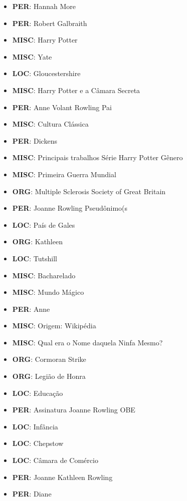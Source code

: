 \documentclass{article}
\begin{document}
\begin{itemize}
\item \textbf{PER}: Hannah More
\item \textbf{PER}: Robert Galbraith
\item \textbf{MISC}: Harry Potter
\item \textbf{MISC}: Yate
\item \textbf{LOC}: Gloucestershire
\item \textbf{MISC}: Harry Potter e a Câmara Secreta
\item \textbf{PER}: Anne Volant Rowling Pai
\item \textbf{MISC}: Cultura Clássica
\item \textbf{PER}: Dickens
\item \textbf{MISC}: Principais trabalhos Série Harry Potter Gênero
\item \textbf{MISC}: Primeira Guerra Mundial
\item \textbf{ORG}: Multiple Sclerosis Society of Great Britain
\item \textbf{PER}: Joanne Rowling Pseudônimo(s
\item \textbf{LOC}: País de Gales
\item \textbf{ORG}: Kathleen
\item \textbf{LOC}: Tutshill
\item \textbf{MISC}: Bacharelado
\item \textbf{MISC}: Mundo Mágico
\item \textbf{PER}: Anne
\item \textbf{MISC}: Origem: Wikipédia
\item \textbf{MISC}: Qual era o Nome daquela Ninfa Mesmo?
\item \textbf{ORG}: Cormoran Strike
\item \textbf{ORG}: Legião de Honra
\item \textbf{LOC}: Educação
\item \textbf{PER}: Assinatura Joanne Rowling OBE
\item \textbf{LOC}: Infância
\item \textbf{LOC}: Chepstow
\item \textbf{LOC}: Câmara de Comércio
\item \textbf{PER}: Joanne Kathleen Rowling
\item \textbf{PER}: Diane
\end{itemize}
\clearpage
\end{document}
